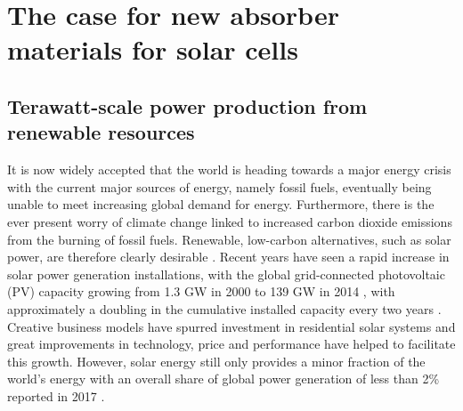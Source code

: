 \documentclass[11pt, twoside]{report}
\begin{document}
\section{The case for new absorber materials for solar cells}

\subsection{Terawatt-scale power production from renewable resources}

It is now widely accepted that the world is heading towards a major energy crisis with the current major sources of energy, namely fossil fuels, eventually being unable to meet increasing global demand for energy. Furthermore, there is the ever present worry of climate change linked to increased carbon dioxide emissions from the burning of fossil fuels. Renewable, low-carbon alternatives, such as solar power, are therefore clearly desirable \cite{PV_for_climate_change}. 
Recent years have seen a rapid increase in solar power generation installations, with the global grid-connected photovoltaic (PV) capacity growing from 1.3 GW in 2000 to 139 GW in 2014 \cite{pathways_129}, with approximately a doubling in the cumulative installed capacity every two years \cite{pathways}. Creative business models have spurred investment in residential solar systems \cite{MIT} and great improvements in technology, price and performance have helped to facilitate this growth. However, solar energy still only provides a minor fraction of the world's energy with an overall share of global power generation of less than 2\% reported in 2017 \cite{bp_solar}. %
\end{document}
